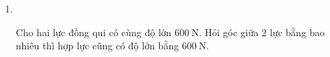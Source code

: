 \begin{enumerate}[label=\bfseries Câu \arabic*:,leftmargin=1.5cm]
{	}

\item {}\\
{Cho hai lực đồng qui có cùng độ lớn $\SI{600}{\newton}$. Hỏi góc giữa 2 lực bằng bao nhiêu thì hợp lực cũng có độ lớn bằng $\SI{600}{\newton}$.
}
	
\end{enumerate}
